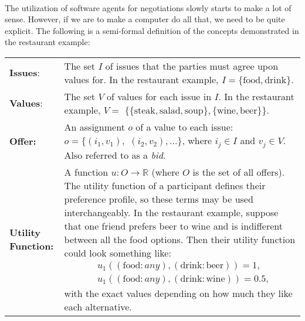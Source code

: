     \paragraph*{}
        The utilization of software agents for negotiations slowly starts to make a lot of sense. However, if we are to make a computer do all that, we need to be quite explicit. The following is a semi-formal definition of the concepts demonstrated in the restaurant example:

        \quad
        
        \renewcommand{\arraystretch}{1.5} %
        \begin{longtable}{l p{290pt}}

                \textbf{Issues}: & The set $I$ of issues that the parties must agree upon values for. In the restaurant example, $I=\{\text{food}, \text{drink}\}$. \\

                \textbf{Values}: & The set $V$ of values for each issue in $I$. In the restaurant example, $V=$ $\{\{\text{steak}, \text{salad}, \text{soup}\}, \{\text{wine}, \text{beer}\}\}$.\\

                \textbf{Offer:} & An assignment $o$ of a value to each issue: $o=\{(i_{1}, v_{1}),$ $(i_{2}, v_{2}), ...\}$, where $i_{j} \in I$ and $v_{j} \in V$. Also referred to as a \emph{bid}. \\

                \textbf{Utility Function:} & A function $u: O \to \mathbb{R}$ (where $O$ is the set of all offers). The utility function of a participant defines their preference profile, so these terms may be used interchangeably. In the restaurant example, suppose that one friend prefers beer to wine and is indifferent between all the food options. Then their utility function could look something like:
                \begin{equation*}
                    \begin{aligned}
                        & u_{1}((\text{food}: \textit{any}), (\text{drink}: \text{beer}))=1, \\
                        & u_{1}((\text{food}: \textit{any}), (\text{drink}: \text{wine}))=0.5,
                    \end{aligned}
                \end{equation*}
                with the exact values depending on how much they like each alternative.\\


\end{longtable}
